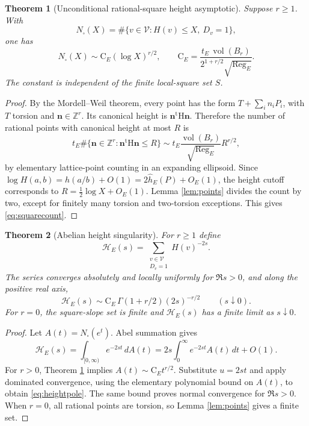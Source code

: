 \documentclass[11pt]{article}
\newtheorem{theorem}{Theorem}[section]
\newcommand{\Z}{\mathbb{Z}}
\newcommand{\calV}{\mathcal{V}}
\newcommand{\Reg}{\operatorname{Reg}}
\newcommand{\vol}{\operatorname{vol}}
\begin{document}
\begin{theorem}[Unconditional rational-square height asymptotic]\label{thm:height}
Suppose $r\ge1$.  With
\[
 N_{\square}(X)=\#\{v\in\calV:H(v)\le X,\ D_v=1\},
\]
one has
\begin{equation}\label{eq:squarecount}
 N_{\square}(X)\sim
 \mathrm C_E(\log X)^{r/2},\qquad
 \mathrm C_E=\frac{t_E\,\vol(B_r)}{2^{1+r/2}\sqrt{\Reg_E}}.
\end{equation}
The constant is independent of the finite local-square set $S$.
\end{theorem}
\begin{proof}
By the Mordell--Weil theorem, every point has the form
$T+\sum_i n_iP_i$, with $T$ torsion and $\mathbf n\in\Z^r$.  Its canonical height is $\mathbf n^{\mathrm t}\mathrm H\mathbf n$.  Therefore the number of rational points with canonical height at most $R$ is
\[
 t_E\#\{\mathbf n\in\Z^r:\mathbf n^{\mathrm t}\mathrm H\mathbf n\le R\}
 \sim t_E\frac{\vol(B_r)}{\sqrt{\Reg_E}}R^{r/2},
\]
by elementary lattice-point counting in an expanding ellipsoid.  Since
$\log H(a,b)=h(a/b)+O(1)=2\widehat h_E(P)+O_E(1)$,
the height cutoff corresponds to $R=\frac12\log X+O_E(1)$.  Lemma \ref{lem:points} divides the count by two, except for finitely many torsion and two-torsion exceptions.  This gives \eqref{eq:squarecount}.
\end{proof}

\begin{theorem}[Abelian height singularity]\label{thm:height-zeta}
For $r\ge1$ define
\begin{equation}\label{eq:hsquare}
 \mathcal H_E(s)=\sum_{\substack{v\in\calV\\D_v=1}}H(v)^{-2s}.
\end{equation}
The series converges absolutely and locally uniformly for $\Re s>0$, and along the positive real axis,
\begin{equation}\label{eq:heightpole}
 \boxed{\displaystyle
 \mathcal H_E(s)\sim
 \mathrm C_E\,\Gamma(1+r/2)(2s)^{-r/2}
 \qquad(s\downarrow0).}
\end{equation}
For $r=0$, the square-slope set is finite and $\mathcal H_E(s)$ has a finite limit as $s\downarrow0$.
\end{theorem}
\begin{proof}
Let $A(t)=N_{\square}(e^t)$.  Abel summation gives
\[
 \mathcal H_E(s)=\int_{[0,\infty)}e^{-2st}\,dA(t)
 =2s\int_0^\infty e^{-2st}A(t)\,dt+O(1).
\]
For $r>0$, Theorem \ref{thm:height} implies
$A(t)\sim\mathrm C_Et^{r/2}$.  Substitute $u=2st$ and apply dominated convergence, using the elementary polynomial bound on $A(t)$, to obtain \eqref{eq:heightpole}.  The same bound proves normal convergence for $\Re s>0$.  When $r=0$, all rational points are torsion, so Lemma \ref{lem:points} gives a finite set.
\end{proof}
\end{document}
